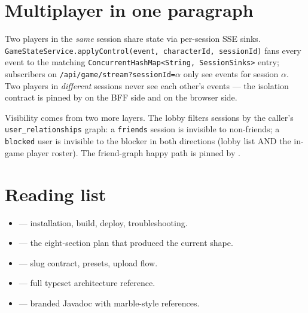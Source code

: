\documentclass[11pt,a4paper,openany]{book}
\begin{document}
\chapter{Multiplayer in one paragraph}
Two players in the \emph{same} session share state via per-session SSE
sinks. \texttt{GameStateService.applyControl(event, characterId,
sessionId)} fans every event to the matching
\texttt{ConcurrentHashMap<String, SessionSinks>} entry; subscribers on
\texttt{/api/game/stream?sessionId=$\alpha$} only see events for
session $\alpha$. Two players in \emph{different} sessions never see
each other's events --- the isolation contract is pinned by
 on the BFF side and
 on the
browser side.

Visibility comes from two more layers. The lobby filters sessions by
the caller's \texttt{user\_relationships} graph: a \texttt{friends}
session is invisible to non-friends; a \texttt{blocked} user is
invisible to the blocker in both directions (lobby list AND the
in-game player roster). The friend-graph happy path is pinned by
.

\chapter{Reading list}
\begin{itemize}
  \item {} — installation, build, deploy, troubleshooting.
  \item {} — the
        eight-section plan that produced the current shape.
  \item {} — slug contract,
        presets, upload flow.
  \item {} —
        full typeset architecture reference.
  \item {} — branded
        Javadoc with marble-style references.
\end{itemize}
\end{document}
